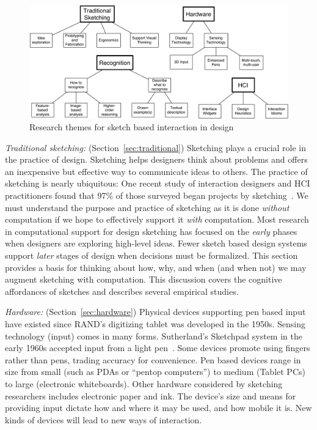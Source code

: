 \begin{figure}
\begin{center}
  \includegraphics[angle=0,width=\linewidth]{img/themes-3-graffle.pdf}
  \caption{Research themes for sketch based interaction in design}
  \label{fig:themes}
\end{center}
\end{figure}

\textit{Traditional sketching:} (Section~\ref{sec:traditional})
Sketching plays a crucial role in the practice of design.  Sketching
helps designers think about problems and offers an inexpensive but
effective way to communicate ideas to others. The practice of
sketching is nearly ubiquitous: One recent study of interaction
designers and HCI practitioners found that 97\% of those surveyed
began projects by sketching~\cite{myers-behavior-design}. We must
understand the purpose and practice of sketching as it is done
\textit{without} computation if we hope to effectively support it
\textit{with} computation. Most research in computational support for
design sketching has focused on the \textit{early} phases when
designers are exploring high-level ideas. Fewer sketch based design
systems support \textit{later} stages of design when decisions must be
formalized. This section provides a basis for thinking about how, why,
and when (and when not) we may augment sketching with
computation. This discussion covers the cognitive affordances of
sketches and describes several empirical studies.

\textit{Hardware:} (Section~\ref{sec:hardware}) Physical devices
supporting pen based input have existed since RAND's digitizing tablet
was developed in the 1950s. Sensing technology (input) comes in many
forms. Sutherland's Sketchpad system in the early 1960s accepted input
from a light pen~\cite{sutherland-sketchpad}. Some devices promote
using fingers rather than pens, trading accuracy for convenience. Pen
based devices range in size from small (such as PDAs or ``pentop
computers'') to medium (Tablet PCs) to large (electronic
whiteboards). Other hardware considered by sketching researchers
includes electronic paper and ink. The device's size and means for
providing input dictate how and where it may be used, and how mobile
it is. New kinds of devices will lead to new ways of interaction.


